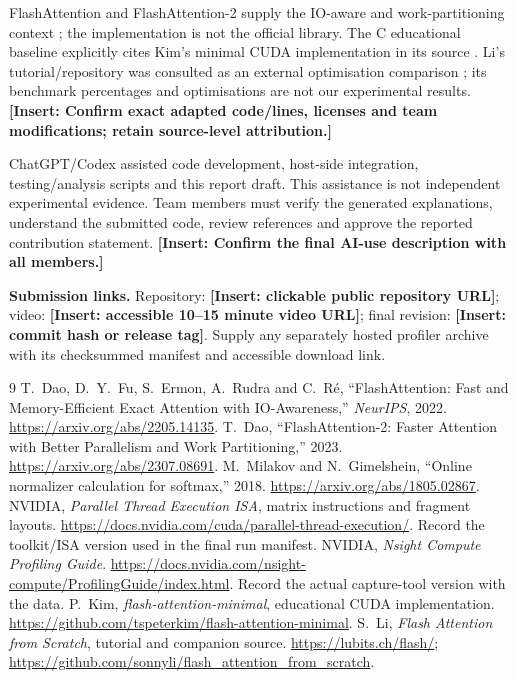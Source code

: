 \documentclass[11pt,a4paper]{article}
\newcommand{\pending}[1]{\textcolor{draftblue}{\textbf{[Insert: #1]}}}
\begin{document}
FlashAttention and FlashAttention-2 supply the IO-aware and work-partitioning
context \cite{flashattention,flashattention2}; the implementation is not the
official library. The C educational baseline explicitly cites Kim's minimal CUDA
implementation in its source \cite{minimal}. Li's tutorial/repository was consulted
as an external optimisation comparison \cite{li}; its benchmark percentages and
optimisations are not our experimental results. \pending{Confirm exact adapted
code/lines, licenses and team modifications; retain source-level attribution.}

ChatGPT/Codex assisted code development, host-side integration, testing/analysis
scripts and this report draft. This assistance is not independent experimental
evidence. Team members must verify the generated explanations, understand the
submitted code, review references and approve the reported contribution statement.
\pending{Confirm the final AI-use description with all members.}

\textbf{Submission links.} Repository: \pending{clickable public repository URL};
video: \pending{accessible 10--15 minute video URL}; final revision:
\pending{commit hash or release tag}. Supply any separately hosted profiler archive
with its checksummed manifest and accessible download link.

\begin{thebibliography}{9}
T.~Dao, D.~Y.~Fu, S.~Ermon, A.~Rudra and C.~R\'e,
``FlashAttention: Fast and Memory-Efficient Exact Attention with IO-Awareness,''
\emph{NeurIPS}, 2022. \url{https://arxiv.org/abs/2205.14135}.
T.~Dao, ``FlashAttention-2: Faster Attention with Better Parallelism and Work
Partitioning,'' 2023. \url{https://arxiv.org/abs/2307.08691}.
M.~Milakov and N.~Gimelshein, ``Online normalizer calculation for softmax,''
2018. \url{https://arxiv.org/abs/1805.02867}.
NVIDIA, \emph{Parallel Thread Execution ISA}, matrix instructions and fragment
layouts. \url{https://docs.nvidia.com/cuda/parallel-thread-execution/}.
Record the toolkit/ISA version used in the final run manifest.
NVIDIA, \emph{Nsight Compute Profiling Guide}.
\url{https://docs.nvidia.com/nsight-compute/ProfilingGuide/index.html}.
Record the actual capture-tool version with the data.
P.~Kim, \emph{flash-attention-minimal}, educational CUDA implementation.
\url{https://github.com/tspeterkim/flash-attention-minimal}.
S.~Li, \emph{Flash Attention from Scratch}, tutorial and companion source.
\url{https://lubits.ch/flash/};
\url{https://github.com/sonnyli/flash_attention_from_scratch}.
\end{thebibliography}
\end{document}
